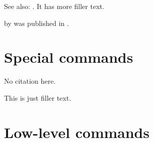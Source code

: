 \documentclass[a4paper]{article}
\begin{document}

See also: . It has more filler text.

 by \citeauthor{companion} was
published in \citeyear{companion}.

\section*{Special commands}


No citation here.\nocite{knuth:ct}




This is just filler text.

\section*{Low-level commands}









\printbibliography
\end{document}
